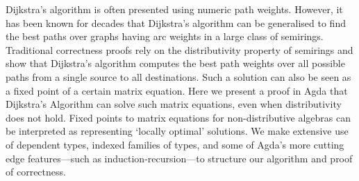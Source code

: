 Dijkstra's algorithm is often presented using numeric path weights.
However, it has been known for decades that Dijkstra's algorithm can be generalised to find the best paths over graphs having arc weights in a large class of semirings.
Traditional correctness proofs rely on the distributivity property of semirings and show that Dijkstra's algorithm computes the best path weights over all possible paths from a single source to all destinations.
Such a solution can also be seen as a fixed point of a certain matrix equation.
Here we present a proof in Agda that Dijkstra's Algorithm can solve such matrix equations, even when distributivity does not hold.
Fixed points to matrix equations for non-distributive algebras can be interpreted as representing `locally optimal' solutions.
We make extensive use of dependent types, indexed families of types, and some of Agda's more cutting edge features---such as induction-recursion---to structure our algorithm and proof of correctness.


